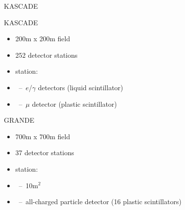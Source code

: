 \documentclass[18pt]{beamer}
\begin{document}
\begin{frame}{KASCADE}
\vspace{-1ex}
\begin{minipage}[t]{0.48\textwidth}
  \begin{block}{KASCADE}
    \begin{itemize}
      \setlength{\itemsep}{0pt}
      \item 200m x 200m field
      \item 252 detector stations
      \item station:
      \item[] ~--~$e$/$\gamma$ detectors (liquid scintillator)
      \item[] ~--~$\mu$ detector (plastic scintillator)
    \end{itemize}
  \end{block}
\end{minipage}
\hfill
\begin{minipage}[t]{0.48\textwidth}
  \begin{block}{GRANDE}
    \begin{itemize}
      \setlength{\itemsep}{0pt}
      \item 700m x 700m field
      \item 37 detector stations
      \item station:
      \item[] ~--~10m$^2$
      \item[] ~--~all-charged particle detector (16 plastic scintillators)
    \end{itemize}
  \end{block}
\end{minipage}
\end{frame}
\end{document}
